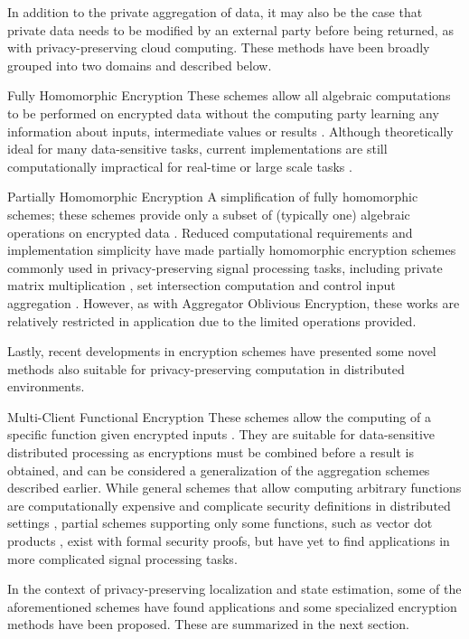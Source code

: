 \documentclass[10pt,letterpaper,oneside,twocolumn,journal]{IEEEtran}
\theoremstyle{definition}
\theoremstyle{definition}
\theoremstyle{remark}
\begin{document}
In addition to the private aggregation of data, it may also be the case that private data needs to be modified by an external party before being returned, as with privacy-preserving cloud computing. These methods have been broadly grouped into two domains and described below.
\begin{LaTeXdescription}
    \item[Fully Homomorphic Encryption] These schemes allow all algebraic computations to be performed on encrypted data without the computing party learning any information about inputs, intermediate values or results \cite{gentryFullyHomomorphicEncryption2009,stehleFasterFullyHomomorphic2010}. Although theoretically ideal for many data-sensitive tasks, current implementations are still computationally impractical for real-time or large scale tasks \cite{acarSurveyHomomorphicEncryption2018}.
    \item[Partially Homomorphic Encryption] A simplification of fully homomorphic schemes; these schemes provide only a subset of (typically one) algebraic operations on encrypted data \cite{elgamalPublicKeyCryptosystem1985,paillierPublicKeyCryptosystemsBased1999,bonehEvaluating2DNFFormulas2005}. Reduced computational requirements and implementation simplicity have made partially homomorphic encryption schemes commonly used in privacy-preserving signal processing tasks, including private matrix multiplication \cite{kogisoCyberSecurityEnhancementNetworked2015}, set intersection computation \cite{kerschbaumOutsourcedPrivateSet2012} and control input aggregation \cite{alexandruEncryptedCooperativeControl2019}. However, as with Aggregator Oblivious Encryption, these works are relatively restricted in application due to the limited operations provided.
\end{LaTeXdescription}
Lastly, recent developments in encryption schemes have presented some novel methods also suitable for privacy-preserving computation in distributed environments.
\begin{LaTeXdescription}
    \item[Multi-Client Functional Encryption] These schemes allow the computing of a specific function given encrypted inputs \cite{bonehFunctionalEncryptionDefinitions2011,goldwasserMultiinputFunctionalEncryption2014}. They are suitable for data-sensitive distributed processing as encryptions must be combined before a result is obtained, and can be considered a generalization of the aggregation schemes described earlier. While general schemes that allow computing arbitrary functions are computationally expensive and complicate security definitions in distributed settings \cite{agrawalFunctionalEncryptionNew2013}, partial schemes supporting only some functions, such as vector dot products \cite{chotardDecentralizedMultiClientFunctional2018}, exist with formal security proofs, but have yet to find applications in more complicated signal processing tasks.
\end{LaTeXdescription}
In the context of privacy-preserving localization and state estimation, some of the aforementioned schemes have found applications and some specialized encryption methods have been proposed. These are summarized in the next section.
\end{document}
